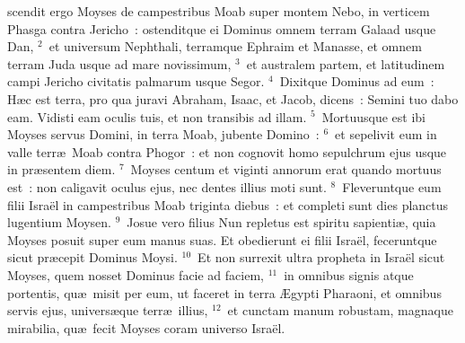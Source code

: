 \bchapter
{}scendit ergo Moyses de campestribus Moab super montem Nebo, in verticem Phasga contra Jericho~: ostenditque ei Dominus omnem terram Galaad usque Dan,
${}^{2}$~et universum Nephthali, terramque Ephraim et Manasse, et omnem terram Juda usque ad mare novissimum,
${}^{3}$~et australem partem, et latitudinem campi Jericho civitatis palmarum usque Segor.
${}^{4}$~Dixitque Dominus ad eum~: H\ae c est terra, pro qua juravi Abraham, Isaac, et Jacob, dicens~: Semini tuo dabo eam. Vidisti eam oculis tuis, et non transibis ad illam.
${}^{5}$~Mortuusque est ibi Moyses servus Domini, in terra Moab, jubente Domino~:
${}^{6}$~et sepelivit eum in valle terr\ae\ Moab contra Phogor~: et non cognovit homo sepulchrum ejus usque in pr\ae sentem diem.
${}^{7}$~Moyses centum et viginti annorum erat quando mortuus est~: non caligavit oculus ejus, nec dentes illius moti sunt.
${}^{8}$~Fleveruntque eum filii Isra\"el in campestribus Moab triginta diebus~: et completi sunt dies planctus lugentium Moysen.
${}^{9}$~Josue vero filius Nun repletus est spiritu sapienti\ae , quia Moyses posuit super eum manus suas. Et obedierunt ei filii Isra\"el, feceruntque sicut pr\ae cepit Dominus Moysi.
${}^{10}$~Et non surrexit ultra propheta in Isra\"el sicut Moyses, quem nosset Dominus facie ad faciem,
${}^{11}$~in omnibus signis atque portentis, qu\ae\ misit per eum, ut faceret in terra \AE gypti Pharaoni, et omnibus servis ejus, univers\ae que terr\ae\ illius,
${}^{12}$~et cunctam manum robustam, magnaque mirabilia, qu\ae\ fecit Moyses coram universo Isra\"el.
